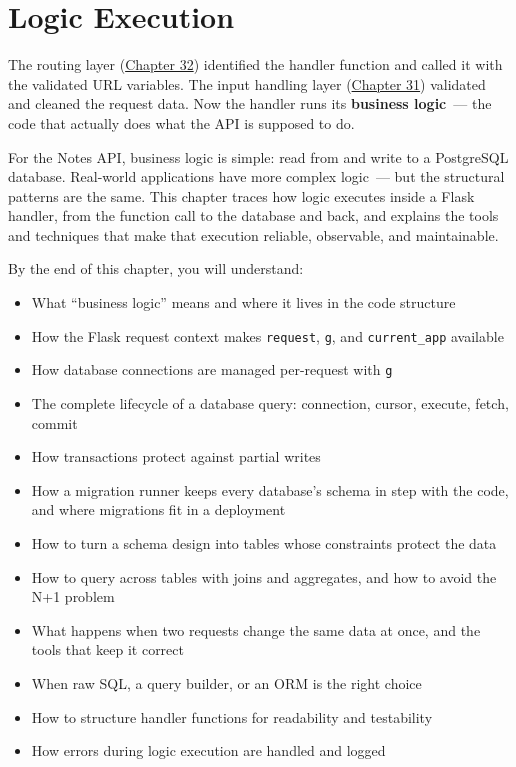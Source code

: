 \setcounter{chapter}{32}
\chapter{Logic Execution}\label{ch:33-logic-execution}

\chapterrule

The routing layer (\hyperref[ch:32-routing]{Chapter 32}) identified the handler function and called it with the validated URL variables. The input handling layer (\hyperref[ch:31-input-handling]{Chapter 31}) validated and cleaned the request data. Now the handler runs its \textbf{business logic}~--- the code that actually does what the API is supposed to do.

For the Notes API, business logic is simple: read from and write to a PostgreSQL database. Real-world applications have more complex logic~--- but the structural patterns are the same. This chapter traces how logic executes inside a Flask handler, from the function call to the database and back, and explains the tools and techniques that make that execution reliable, observable, and maintainable.

\begin{objectives}

By the end of this chapter, you will understand:

\begin{itemize}
\tightlist
\item
  What ``business logic'' means and where it lives in the code structure
\item
  How the Flask request context makes \texttt{request}, \texttt{g}, and \texttt{current\_app} available
\item
  How database connections are managed per-request with \texttt{g}
\item
  The complete lifecycle of a database query: connection, cursor, execute, fetch, commit
\item
  How transactions protect against partial writes
\item
  How a migration runner keeps every database's schema in step with the code, and where migrations fit in a deployment
\item
  How to turn a schema design into tables whose constraints protect the data
\item
  How to query across tables with joins and aggregates, and how to avoid the N+1 problem
\item
  What happens when two requests change the same data at once, and the tools that keep it correct
\item
  When raw SQL, a query builder, or an ORM is the right choice
\item
  How to structure handler functions for readability and testability
\item
  How errors during logic execution are handled and logged
\end{itemize}

\end{objectives}

